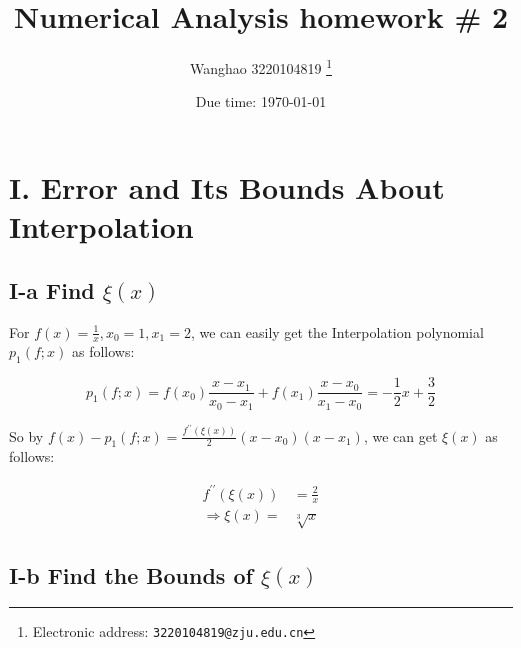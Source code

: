 \documentclass[a4paper]{article}
\begin{document}
\title{Numerical Analysis homework \# 2}

\author{Wanghao 3220104819
  \thanks{Electronic address: \texttt{3220104819@zju.edu.cn}}}


\date{Due time: \today}

\maketitle



\section*{I. Error and Its Bounds About Interpolation}

\subsection*{I-a Find $\xi(x)$}

For $f(x) = \frac{1}{x}, x_0=1, x_1=2$, we can easily get the Interpolation polynomial $p_1(f; x)$ as follows:

\begin{equation}
  p_1(f; x) = f(x_0) \frac{x-x_1}{x_0-x_1} + f(x_1) \frac{x-x_0}{x_1-x_0} = -\frac{1}{2} x + \frac{3}{2} 
\end{equation}

So by $f(x) - p_1(f; x) = \frac{f^{\prime \prime} (\xi (x))}{2} (x-x_0) (x-x_1)$, we can get $\xi(x)$ as follows:

\begin{equation}
  \begin{aligned}
    f^{\prime \prime} (\xi (x)) &= \frac{2}{x} \\
    \Rightarrow \xi (x) = &\sqrt[3]{x}
  \end{aligned}
\end{equation}

\subsection*{I-b Find the Bounds of $\xi(x)$}
\end{document}

